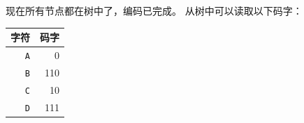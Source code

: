 现在所有节点都在树中了，编码已完成。
从树中可以读取以下码字：
\begin{center}
\begin{tabular}{rr}
字符 & 码字 \\
\hline
\texttt{A} & 0 \\
\texttt{B} & 110 \\
\texttt{C} & 10 \\
\texttt{D} & 111 \\
\end{tabular}
\end{center}
